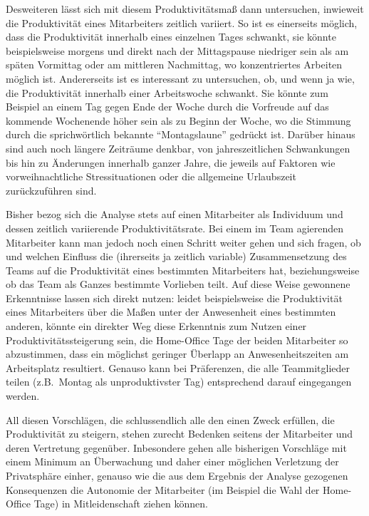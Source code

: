 \documentclass[a4paper,12pt,]{article}
\begin{document}
Desweiteren lässt sich mit diesem Produktivitätsmaß dann untersuchen, inwieweit die Produktivität eines Mitarbeiters zeitlich variiert. So ist es einerseits möglich, dass die Produktivität innerhalb eines einzelnen Tages schwankt, sie könnte beispielsweise morgens und direkt nach der Mittagspause niedriger sein als am späten Vormittag oder am mittleren Nachmittag, wo konzentriertes Arbeiten möglich ist. Andererseits ist es interessant zu untersuchen, ob, und wenn ja wie, die Produktivität innerhalb einer Arbeitswoche schwankt. Sie könnte zum Beispiel an einem Tag gegen Ende der Woche durch die Vorfreude auf das kommende Wochenende höher sein als zu Beginn der Woche, wo die Stimmung durch die sprichwörtlich bekannte ``Montagslaune'' gedrückt ist. Darüber hinaus sind auch noch längere Zeiträume denkbar, von jahreszeitlichen Schwankungen bis hin zu Änderungen innerhalb ganzer Jahre, die jeweils auf Faktoren wie vorweihnachtliche Stressituationen oder die allgemeine Urlaubszeit zurückzuführen sind.

Bisher bezog sich die Analyse stets auf einen Mitarbeiter als Individuum und dessen zeitlich variierende Produktivitätsrate. Bei einem im Team agierenden Mitarbeiter kann man jedoch noch einen Schritt weiter gehen und sich fragen, ob und welchen Einfluss die (ihrerseits ja zeitlich variable) Zusammensetzung des Teams auf die Produktivität eines bestimmten Mitarbeiters hat, beziehungsweise ob das Team als Ganzes bestimmte Vorlieben teilt. Auf diese Weise gewonnene Erkenntnisse lassen sich direkt nutzen: leidet beispielsweise die Produktivität eines Mitarbeiters über die Maßen unter der Anwesenheit eines bestimmten anderen, könnte ein direkter Weg diese Erkenntnis zum Nutzen einer Produktivitätssteigerung sein, die Home-Office Tage der beiden Mitarbeiter so abzustimmen, dass ein möglichst geringer Überlapp an Anwesenheitszeiten am Arbeitsplatz resultiert. Genauso kann bei Präferenzen, die alle Teammitglieder teilen (z.B.~Montag als unproduktivster Tag) entsprechend darauf eingegangen werden.

All diesen Vorschlägen, die schlussendlich alle den einen Zweck erfüllen, die Produktivität zu steigern, stehen zurecht Bedenken seitens der Mitarbeiter und deren Vertretung gegenüber. Inbesondere gehen alle bisherigen Vorschläge mit einem Minimum an Überwachung und daher einer möglichen Verletzung der Privatsphäre einher, genauso wie die aus dem Ergebnis der Analyse gezogenen Konsequenzen die Autonomie der Mitarbeiter (im Beispiel die Wahl der Home-Office Tage) in Mitleidenschaft ziehen können.
\end{document}
